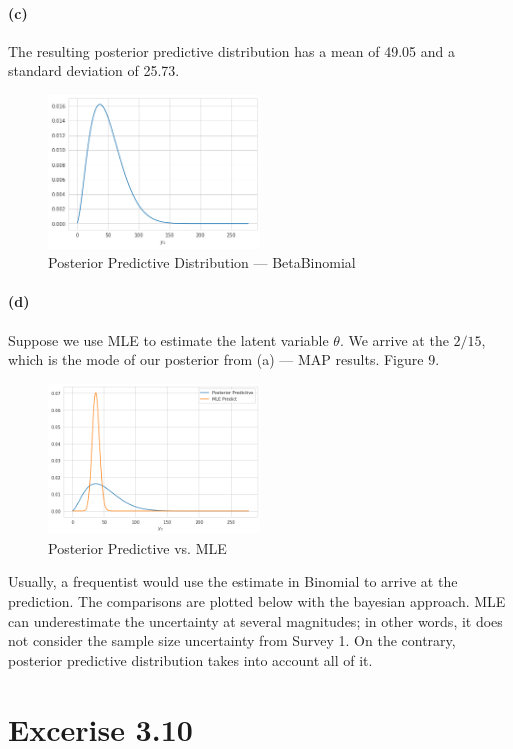 \documentclass[11pt, letterpaper]{article}
\begin{document}
\paragraph{(c)}
The resulting posterior predictive distribution has a mean of 49.05 and a standard deviation of 25.73.

\begin{figure}[h]
    \captionsetup{justification=centering, margin=2cm}
    \centering
    \includegraphics[width=0.5\textwidth]{hw2_3.7.c.png}
    \caption{Posterior Predictive Distribution --- BetaBinomial}
\end{figure}

\paragraph{(d)}
Suppose we use MLE to estimate the latent variable $\theta$. We arrive at the $2/15$, which is the mode of our posterior
from (a) --- MAP results. Figure 9.

\begin{figure}[!h]
    \captionsetup{justification=centering, margin=2cm}
    \centering
    \includegraphics[width=0.5\textwidth]{hw2_3.7.d.png}
    \caption{Posterior Predictive vs. MLE}
\end{figure}

Usually, a frequentist would use the estimate in Binomial to arrive at the prediction. The comparisons
are plotted below with the bayesian approach. MLE can underestimate the uncertainty at several magnitudes; in
other words, it does not consider the sample size uncertainty from Survey 1. On the contrary, posterior predictive distribution
takes into account all of it.


\section{Excerise 3.10}
\end{document}
